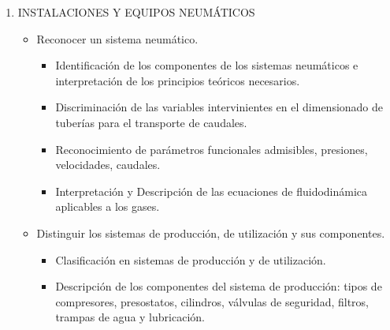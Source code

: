 \documentclass[../main]{subfiles}
\begin{document}
\begin{enumerate}
\begin{itemize}
      \item Reconocer sistemas oleohidráulicos.
        \begin{itemize}
          \item Identificación de sistemas oleohidráulicos y circuitos
            de presión: componentes básicos y lógica de
            funcionamiento de los componentes.
          \item Esquematización de los circuitos en sistemas
            oleohidráulicos y su aplicabilidad.
            Descripción de elementos y equipos oleohidráulicos:
            prensas hidráulicas, sistemas de carga y transporte,
            sistemas de elevación, sistemas para compactación.
          \item Determinación de presiones admisibles en circuitos y
            sistemas oleohidráulico e identificación de las medidas
            de seguridad correspondientes.
        \end{itemize}
    \end{itemize}
  \item INSTALACIONES Y EQUIPOS NEUMÁTICOS
    \begin{itemize}
      \item Reconocer un sistema neumático.
        \begin{itemize}
          \item Identificación de los componentes de los sistemas
            neumáticos e interpretación de los principios teóricos necesarios.
          \item Discriminación de las variables intervinientes en el
            dimensionado de tuberías para el transporte de caudales.
          \item Reconocimiento de parámetros funcionales admisibles, presiones,
            velocidades, caudales.
          \item Interpretación y Descripción de las ecuaciones de
            fluidodinámica aplicables a los gases.
        \end{itemize}
      \item Distinguir los sistemas de producción, de utilización y
        sus componentes.
        \begin{itemize}
          \item Clasificación en sistemas de producción y de utilización.
          \item Descripción de los componentes del sistema de
            producción: tipos de compresores, presostatos, cilindros,
            válvulas de seguridad, filtros, trampas de agua y lubricación.

\end{itemize}
\end{itemize}
\end{enumerate}
\end{document}
